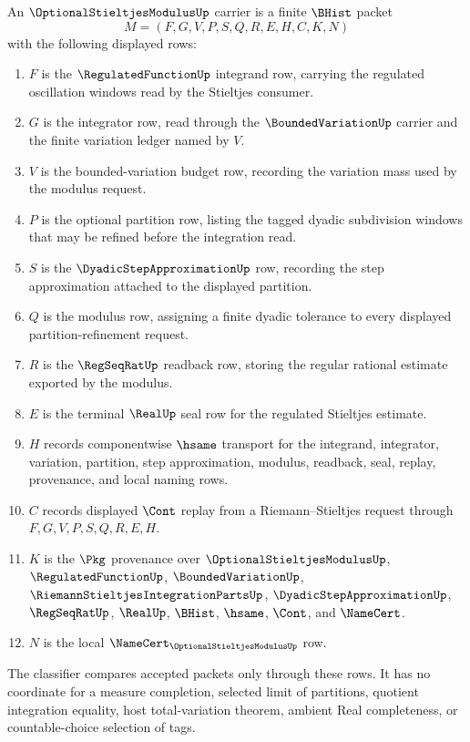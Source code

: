 \begin{definition}
\label{def:optional-stieltjes-modulus-carrier}
An $\OptionalStieltjesModulusUp$ carrier is a finite $\BHist$ packet
$$
M=(F,G,V,P,S,Q,R,E,H,C,K,N)
$$
with the following displayed rows:
\begin{enumerate}
\item $F$ is the $\RegulatedFunctionUp$ integrand row, carrying the regulated oscillation windows read by the Stieltjes consumer.
\item $G$ is the integrator row, read through the $\BoundedVariationUp$ carrier and the finite variation ledger named by $V$.
\item $V$ is the bounded-variation budget row, recording the variation mass used by the modulus request.
\item $P$ is the optional partition row, listing the tagged dyadic subdivision windows that may be refined before the integration read.
\item $S$ is the $\DyadicStepApproximationUp$ row, recording the step approximation attached to the displayed partition.
\item $Q$ is the modulus row, assigning a finite dyadic tolerance to every displayed partition-refinement request.
\item $R$ is the $\RegSeqRatUp$ readback row, storing the regular rational estimate exported by the modulus.
\item $E$ is the terminal $\RealUp$ seal row for the regulated Stieltjes estimate.
\item $H$ records componentwise $\hsame$ transport for the integrand, integrator, variation, partition, step approximation, modulus, readback, seal, replay, provenance, and local naming rows.
\item $C$ records displayed $\Cont$ replay from a Riemann--Stieltjes request through $F,G,V,P,S,Q,R,E,H$.
\item $K$ is the $\Pkg$ provenance over $\OptionalStieltjesModulusUp$, $\RegulatedFunctionUp$, $\BoundedVariationUp$, $\RiemannStieltjesIntegrationPartsUp$, $\DyadicStepApproximationUp$, $\RegSeqRatUp$, $\RealUp$, $\BHist$, $\hsame$, $\Cont$, and $\NameCert$.
\item $N$ is the local $\NameCert_{\OptionalStieltjesModulusUp}$ row.
\end{enumerate}
The classifier compares accepted packets only through these rows. It has no coordinate for a measure completion, selected limit of partitions, quotient integration equality, host total-variation theorem, ambient Real completeness, or countable-choice selection of tags.
\end{definition}

